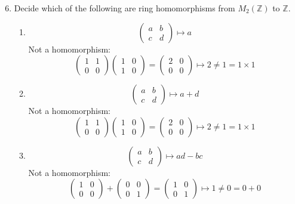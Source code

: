 \documentclass{report}
\newcommand{\Z}{\mathbb{Z}}
\begin{document}
\begin{enumerate}
    
    \setcounter{enumi}{5}
    \item Decide which of the following are ring homomorphisms from $M_2(\Z)$ to $\Z$.
    \begin{enumerate}
        \item $$\begin{pmatrix}
            a&b\\
            c&d
        \end{pmatrix}\mapsto a$$
        Not a homomorphism:
        $$\begin{pmatrix} 1&1\\ 0&0 \end{pmatrix}\begin{pmatrix} 1&0\\ 1&0 \end{pmatrix}=\begin{pmatrix} 2&0\\ 0&0\end{pmatrix} \longmapsto 2\neq 1=1\times 1$$
        \item $$\begin{pmatrix}
            a&b\\
            c&d
        \end{pmatrix}\mapsto a+d$$
        Not a homomorphism:
        $$\begin{pmatrix} 1&1\\ 0&0 \end{pmatrix}\begin{pmatrix} 1&0\\ 1&0 \end{pmatrix}=\begin{pmatrix} 2&0\\ 0&0\end{pmatrix} \longmapsto 2\neq 1=1\times 1$$
        \item $$\begin{pmatrix}
            a&b\\
            c&d
        \end{pmatrix}\mapsto ad-bc$$
        Not a homomorphism:
        $$\begin{pmatrix} 1&0\\ 0&0 \end{pmatrix}+\begin{pmatrix} 0&0\\ 0&1 \end{pmatrix}=\begin{pmatrix} 1&0\\ 0&1\end{pmatrix} \longmapsto 1\neq 0=0+0$$

\end{enumerate}
\end{enumerate}
\end{document}
